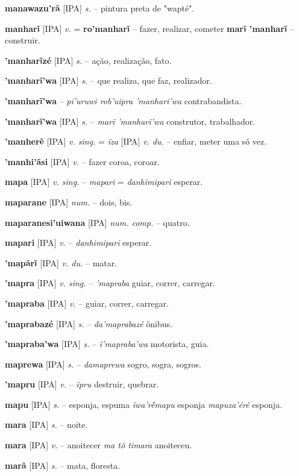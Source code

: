 \textbf{manawazu'rã} [IPA] \textit{s.} -- pintura preta de "wapté".

\textbf{manharĩ} [IPA] \textit{v.} = \textbf{ro'manharĩ} -- fazer, realizar, cometer  \textbf{marĩ 'manharĩ} -- construir.

\textbf{'manharĩzé} [IPA] \textit{s.} -- ação, realização, fato.

\textbf{'manharĩ'wa} [IPA] \textit{s.} -- que realiza, que faz, realizador.

\textbf{'manharĩ'wa} -- \textit{pi'uruwi rob'uipra 'manhari'wa} contrabandista.

\textbf{'manharĩ'wa} [IPA] \textit{s.} -- \textit{marĩ 'manharĩ'wa} construtor, trabalhador.

\textbf{'manherẽ} [IPA] \textit{v. sing.} = \textit{ĩza} [IPA] \textit{v. du.} -- enfiar, meter uma só vez.

\textbf{'manhi'ãsi} [IPA] \textit{v.} -- fazer coroa, coroar.

\textbf{mapa} [IPA] \textit{v. sing.} -- \textit{mapari} = \textit{danhimipari} esperar.

\textbf{maparane} [IPA] \textit{num.} -- dois, bis.

\textbf{maparanesi'uiwana} [IPA] \textit{num. comp.} -- quatro.

\textbf{mapari} [IPA] \textit{v.} -- \textit{danhimipari} esperar.

\textbf{'mapãrĩ} [IPA] \textit{v. du.} -- matar.

\textbf{'mapra} [IPA] \textit{v. sing.} -- \textit{'mapraba} guiar, correr, carregar.

\textbf{'mapraba} [IPA] \textit{v.} -- guiar, correr, carregar.

\textbf{'maprabazé} [IPA] \textit{s.} -- \textit{da'maprabazé} ônibus.

\textbf{'mapraba'wa} [IPA] \textit{s.} -- \textit{ĩ'mapraba'wa} motorista, guia.

\textbf{maprewa} [IPA] \textit{s.} -- \textit{damaprewa} sogro, sogra, sogros.

\textbf{'mapru} [IPA] \textit{v.} -- \textit{ĩpru} destruir, quebrar.

\textbf{mapu} [IPA] \textit{s.} -- esponja, espuma  \textit{ĩwa'ré̃mapu} esponja  \textit{mapuza'éré} esponja.

\textbf{mara} [IPA] \textit{s.} -- noite.

\textbf{mara} [IPA] \textit{v.} -- anoitecer  \textit{ma tõ timara} anoiteceu.

\textbf{marã} [IPA] \textit{s.} -- mata, floresta.

